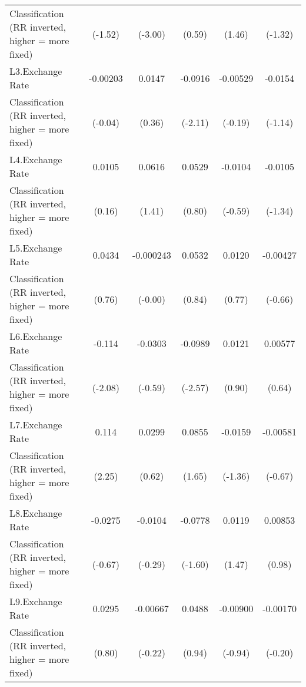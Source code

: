 {\begin{tabular}{l*{5}{c}}
Classification (RR inverted, higher = more fixed)&  (-1.52)         &  (-3.00)         &   (0.59)         &   (1.46)         &  (-1.32)         \\
\addlinespace
L3.Exchange Rate& -0.00203         &   0.0147         &  -0.0916\sym{*}  & -0.00529         &  -0.0154         \\
Classification (RR inverted, higher = more fixed)&  (-0.04)         &   (0.36)         &  (-2.11)         &  (-0.19)         &  (-1.14)         \\
\addlinespace
L4.Exchange Rate&   0.0105         &   0.0616         &   0.0529         &  -0.0104         &  -0.0105         \\
Classification (RR inverted, higher = more fixed)&   (0.16)         &   (1.41)         &   (0.80)         &  (-0.59)         &  (-1.34)         \\
\addlinespace
L5.Exchange Rate&   0.0434         &-0.000243         &   0.0532         &   0.0120         & -0.00427         \\
Classification (RR inverted, higher = more fixed)&   (0.76)         &  (-0.00)         &   (0.84)         &   (0.77)         &  (-0.66)         \\
\addlinespace
L6.Exchange Rate&   -0.114\sym{*}  &  -0.0303         &  -0.0989\sym{*}  &   0.0121         &  0.00577         \\
Classification (RR inverted, higher = more fixed)&  (-2.08)         &  (-0.59)         &  (-2.57)         &   (0.90)         &   (0.64)         \\
\addlinespace
L7.Exchange Rate&    0.114\sym{*}  &   0.0299         &   0.0855         &  -0.0159         & -0.00581         \\
Classification (RR inverted, higher = more fixed)&   (2.25)         &   (0.62)         &   (1.65)         &  (-1.36)         &  (-0.67)         \\
\addlinespace
L8.Exchange Rate&  -0.0275         &  -0.0104         &  -0.0778         &   0.0119         &  0.00853         \\
Classification (RR inverted, higher = more fixed)&  (-0.67)         &  (-0.29)         &  (-1.60)         &   (1.47)         &   (0.98)         \\
\addlinespace
L9.Exchange Rate&   0.0295         & -0.00667         &   0.0488         & -0.00900         & -0.00170         \\
Classification (RR inverted, higher = more fixed)&   (0.80)         &  (-0.22)         &   (0.94)         &  (-0.94)         &  (-0.20)         \\

\end{tabular}}
